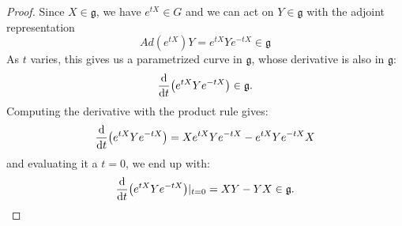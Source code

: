 \documentclass[11pt,a4paper]{article}
\theoremstyle{definition}
\numberwithin{equation}{section}
\begin{document}
\begin{proof}
    Since $X \in \mathfrak{g}$, we have $e^{tX} \in G$ and we can act on $Y \in \mathfrak{g}$ with the adjoint representation
    \begin{equation*}
        Ad(e^{tX})Y = e^{tX}Ye^{-tX} \in \mathfrak{g}
    \end{equation*}
As $t$ varies, this gives us a parametrized curve in $\mathfrak{g}$, whose derivative is also in $\mathfrak{g}$:
\begin{equation*}
    \dv{t} (e^{tX}Ye^{-tX}) \in \mathfrak{g}.
\end{equation*}
Computing the derivative with the product rule gives:
\begin{equation*}
    \dv{t} (e^{tX}Ye^{-tX}) = X e^{tX}Ye^{-tX} - e^{tX}Ye^{-tX}X
\end{equation*}
and evaluating it a $t=0$, we end up with:
\begin{equation*}
    \dv{t} (e^{tX}Ye^{-tX})|_{t=0} = XY - YX \in \mathfrak{g}.
\end{equation*}
\end{proof}
\end{document}
